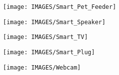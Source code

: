 \begin{frame}
\begin{figure}[H]
		\begin{subfigure}{0.2\linewidth}
			\centering
			\texttt{[image: IMAGES/Smart\_Pet\_Feeder]}
			\label{fig:sub1}
		\end{subfigure}%
		\begin{subfigure}{0.2\linewidth}
			\centering
			\texttt{[image: IMAGES/Smart\_Speaker]}
			\label{fig:sub1}
		\end{subfigure}%
		\begin{subfigure}{0.2\linewidth}
			\centering
			\texttt{[image: IMAGES/Smart\_TV]}
			\label{fig:sub1}
		\end{subfigure}%
		\begin{subfigure}{0.2\linewidth}
			\centering
			\texttt{[image: IMAGES/Smart\_Plug]}
			\label{fig:sub3}
		\end{subfigure}%
		\begin{subfigure}{0.2\linewidth}
			\centering
			\texttt{[image: IMAGES/Webcam]}
			\label{fig:sub3}
		\end{subfigure}\\[1ex]
		\label{fig:test}
	\end{figure}

\end{frame}

\cprotect{}

